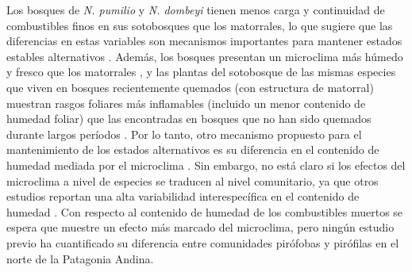 Los bosques de \textit{N. pumilio} y \textit{N. dombeyi} tienen menos carga y continuidad de combustibles finos en sus sotobosques que los matorrales, lo que sugiere que las diferencias en estas variables son mecanismos importantes para mantener estados estables alternativos \citep{paritsis_positive_2015, tiribelli_changes_2018}. Además, los bosques presentan un microclima más húmedo y fresco que los matorrales \citep{paritsis_positive_2015}, y las plantas del sotobosque de las mismas especies que viven en bosques recientemente quemados (con estructura de matorral) muestran rasgos foliares más inflamables (incluido un menor contenido de humedad foliar) que las encontradas en bosques que no han sido quemados durante largos períodos \citep{blackhall_is_2012}. Por lo tanto, otro mecanismo propuesto para el mantenimiento de los estados alternativos es su diferencia en el contenido de humedad mediada por el microclima \citep{kitzberger_firevegetation_2016}. Sin embargo, no está claro si los efectos del microclima a nivel de especies se traducen al nivel comunitario, ya que otros estudios reportan una alta variabilidad interespecífica en el contenido de humedad \citep{bianchi_live_2015, bianchi_comparison_2018, blackhall_flammability_2019}. Con respecto al contenido de humedad de los combustibles muertos 
se espera que muestre un efecto más marcado del microclima, pero ningún estudio previo ha cuantificado su diferencia entre comunidades pirófobas y pirófilas en el norte de la Patagonia Andina.

